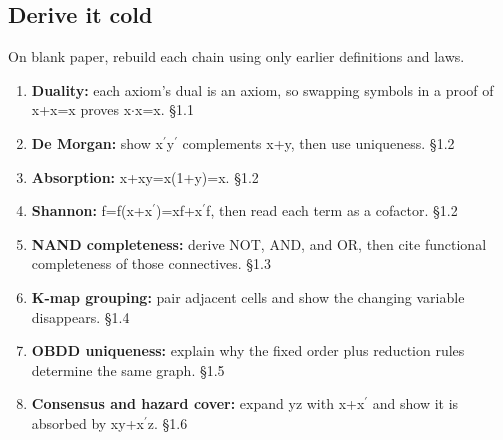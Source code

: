 \documentclass[11pt]{article}
\begin{document}
\begin{keepsection}
\section{Derive it cold}

On blank paper, rebuild each chain using only earlier definitions and laws.

\begin{enumerate}
\item \textbf{Duality:} each axiom’s dual is an axiom, so swapping symbols in a proof of x+x=x proves x\ensuremath{\cdot}x=x. \hfill{\small\color{FAUblue}§1.1}
\item \textbf{De Morgan:} show x\ensuremath{{}^{\prime}}y\ensuremath{{}^{\prime}} complements x+y, then use uniqueness. \hfill{\small\color{FAUblue}§1.2}
\item \textbf{Absorption:} x+xy=x(1+y)=x. \hfill{\small\color{FAUblue}§1.2}
\item \textbf{Shannon:} f=f(x+x\ensuremath{{}^{\prime}})=xf+x\ensuremath{{}^{\prime}}f, then read each term as a cofactor. \hfill{\small\color{FAUblue}§1.2}
\item \textbf{NAND completeness:} derive NOT, AND, and OR, then cite functional completeness of those connectives. \hfill{\small\color{FAUblue}§1.3}
\item \textbf{K-map grouping:} pair adjacent cells and show the changing variable disappears. \hfill{\small\color{FAUblue}§1.4}
\item \textbf{OBDD uniqueness:} explain why the fixed order plus reduction rules determine the same graph. \hfill{\small\color{FAUblue}§1.5}
\item \textbf{Consensus and hazard cover:} expand yz with x+x\ensuremath{{}^{\prime}} and show it is absorbed by xy+x\ensuremath{{}^{\prime}}z. \hfill{\small\color{FAUblue}§1.6}
\end{enumerate}
\end{keepsection}
\end{document}
